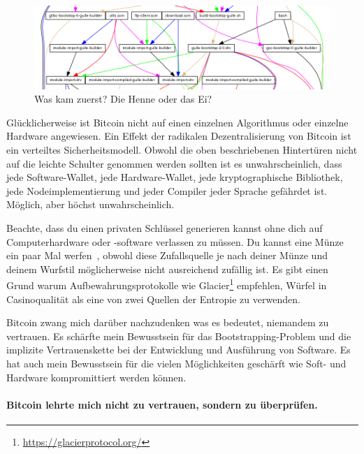 \begin{figure}
  \includegraphics{assets/images/guix-bootstrap-dependencies.png}
  \caption{Was kam zuerst? Die Henne oder das Ei?}
  \label{fig:guix-bootstrap-dependencies}
\end{figure}

Glücklicherweise ist Bitcoin nicht auf einen einzelnen Algorithmus oder einzelne
Hardware angewiesen. Ein Effekt der radikalen Dezentralisierung von Bitcoin ist
ein verteiltes Sicherheitsmodell. Obwohl die oben beschriebenen Hintertüren
nicht auf die leichte Schulter genommen werden sollten ist es unwahrscheinlich,
dass jede Software-Wallet, jede Hardware-Wallet, jede kryptographische
Bibliothek, jede Nodeimplementierung und jeder Compiler jeder Sprache gefährdet
ist. Möglich, aber höchst unwahrscheinlich.

Beachte, dass du einen privaten Schlüssel generieren kannst ohne dich auf
Computerhardware oder -software verlassen zu müssen. Du kannst eine Münze ein
paar Mal werfen~\cite{antonopoulos2014mastering}, obwohl diese Zufallsquelle je
nach deiner Münze und deinem Wurfstil möglicherweise nicht ausreichend zufällig
ist. Es gibt einen Grund warum Aufbewahrungsprotokolle wie
Glacier\footnote{\url{https://glacierprotocol.org/}} empfehlen, Würfel in
Casinoqualität als eine von zwei Quellen der Entropie zu verwenden.

Bitcoin zwang mich darüber nachzudenken was es bedeutet, niemandem zu vertrauen.
Es schärfte mein Bewusstsein für das Bootstrapping-Problem und die implizite
Vertrauenskette bei der Entwicklung und Ausführung von Software. Es hat auch
mein Bewusstsein für die vielen Möglichkeiten geschärft wie Soft- und Hardware
kompromittiert werden können.

\paragraph{Bitcoin lehrte mich nicht zu vertrauen, sondern zu überprüfen.}

